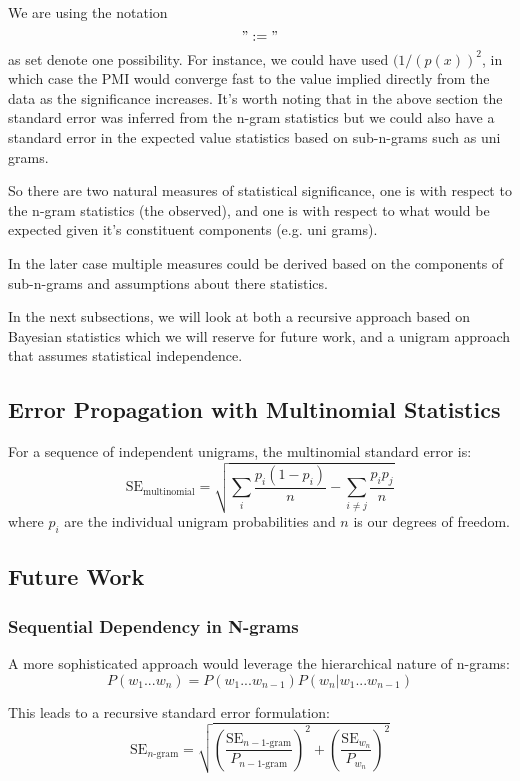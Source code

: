 \documentclass[12pt,a4paper]{article}
\begin{document}
We are using the notation $$":="$$ as set denote one possibility. For instance, we could have used $(1/(p(x))^2$, in which case the PMI would converge fast to the value implied directly from the data as the significance increases. It's worth noting that in the above section the standard error was inferred from the n-gram statistics but we could also have a standard error in the expected value statistics based on sub-n-grams such as uni grams. 

So there are two natural measures of statistical significance, one is with respect to the n-gram statistics (the observed), and one is with respect to what would be expected given it's constituent components (e.g. uni grams). 

In the later case multiple measures could be derived based on the components of sub-n-grams and assumptions about there statistics. 

In the next subsections, we will look at both a recursive approach based on Bayesian statistics which we will reserve for future work, and a unigram approach that assumes statistical independence. 

\subsection{Error Propagation with Multinomial Statistics}
For a sequence of independent unigrams, the multinomial standard error is:
\begin{equation}
\text{SE}_{\text{multinomial}} = \sqrt{\sum_{i} \frac{p_i(1-p_i)}{n} - \sum_{i\neq j}\frac{p_ip_j}{n}}
\end{equation}
where $p_i$ are the individual unigram probabilities and $n$ is our degrees of freedom.

\subsection{Future Work}
\subsubsection{Sequential Dependency in N-grams}
A more sophisticated approach would leverage the hierarchical nature of n-grams:
\begin{equation}
P(w_1...w_n) = P(w_1...w_{n-1})P(w_n|w_1...w_{n-1})
\end{equation}

This leads to a recursive standard error formulation:
\begin{equation}
\text{SE}_{n\text{-gram}} = \sqrt{\left(\frac{\text{SE}_{n-1\text{-gram}}}{P_{n-1\text{-gram}}}\right)^2 + \left(\frac{\text{SE}_{w_n}}{P_{w_n}}\right)^2}
\end{equation}
\end{document}
